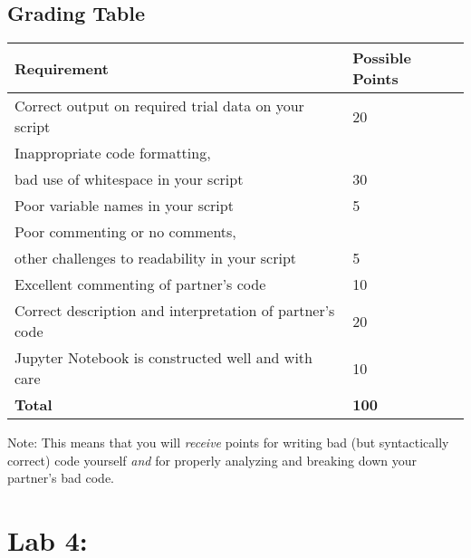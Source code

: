 \subsection*{Grading Table}
\begin{tabular}{|l|l|}
\hline
    Requirement & Possible Points \\ \hline
    Correct output on required trial data on your script & 20 \\ \hline
    Inappropriate code formatting,\\bad use of whitespace in your script & 30 \\ \hline
    Poor variable names in your script & 5 \\ \hline
    Poor commenting or no comments,\\other challenges to readability in your script & 5 \\ \hline
    Excellent commenting of partner's code & 10 \\ \hline
    Correct description and interpretation of partner's code & 20 \\ \hline
    Jupyter Notebook is constructed well and with care & 10 \\
    \hline
    \textbf{Total} & \textbf{100} \\ \hline
\end{tabular}

Note: This means that you will \textit{receive} points for writing bad (but syntactically correct) code yourself \textit{and} for properly analyzing and breaking down your partner's bad code.

\section*{Lab 4: }